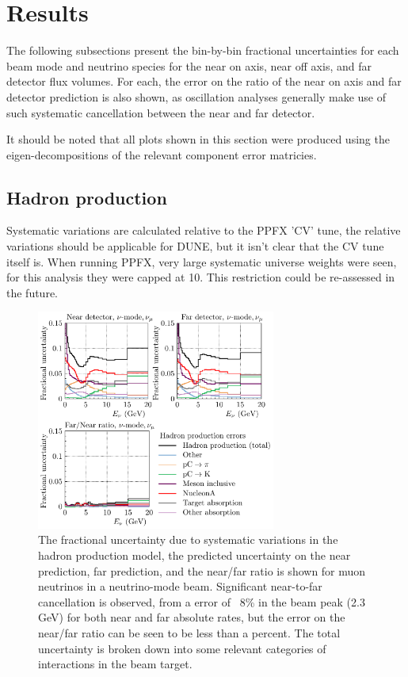 \documentclass{article}
\begin{document}
\section{Results}

The following subsections present the bin-by-bin fractional uncertainties for each beam mode and neutrino species for the near on axis, near off axis, and far detector flux volumes. For each, the error on the ratio of the near on axis and far detector prediction is also shown, as oscillation analyses generally make use of such systematic cancellation between the near and far detector.

It should be noted that all plots shown in this section were produced using the eigen-decompositions of the relevant component error matricies.

\subsection{Hadron production}

Systematic variations are calculated relative to the PPFX 'CV' tune, the relative variations should be applicable for DUNE, but it isn't clear that the CV tune itself is. 
When running PPFX, very large systematic universe weights were seen, for this analysis they were capped at 10. This restriction could be re-assessed in the future.

\begin{figure}
  \centering
  \includegraphics[width=0.7\textwidth]{plots/fracerrs/numode_numu_PPFX}
  \caption{The fractional uncertainty due to systematic variations in the hadron production model, the predicted uncertainty on the near prediction, far prediction, and the near/far ratio is shown for muon neutrinos in a neutrino-mode beam. Significant near-to-far cancellation is observed, from a error of ~8\% in the beam peak (2.3 GeV) for both near and far absolute rates, but the error on the near/far ratio can be seen to be less than a percent. The total uncertainty is broken down into some relevant categories of interactions in the beam target.}
  \label{fig:ppfx_nu_numu}
\end{figure}
\end{document}
